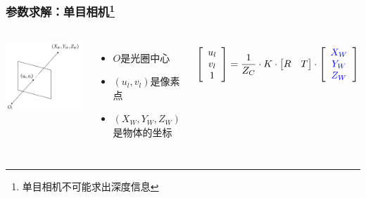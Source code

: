 \documentclass[aspectratio=43]{beamer}
\begin{document}
		\begin{frame}
		\frametitle{参数求解：单目相机\footnote{单目相机不可能求出深度信息}}
		\begin{columns}
			\column{5cm}
			\begin{center}
				\includegraphics[scale=0.6]{单目相机参数求解}
			\end{center}
			\column{7.5cm}
			\begin{itemize}
				\item $O$是光圈中心
				\item $(u_l,v_l)$是像素点
				\item $(X_W,Y_W,Z_W)$是物体的坐标
			\end{itemize}
			\vspace{0.8em}
			\begin{equation}
				\begin{aligned}
					\left[ \begin{array}{c}
						u_l\\
						v_l\\
						1\\
					\end{array} \right] =\frac{1}{Z_C}\cdot K\cdot \left[ \begin{matrix}
						R&		T\\
					\end{matrix} \right] \cdot \left[ {\color{blue} \begin{array}{c}
							X_W\\
							Y_W\\
							Z_W\\
					\end{array}} \right] 
				\end{aligned}
			\end{equation}
		\end{columns}
	\end{frame}
	
\end{document}
